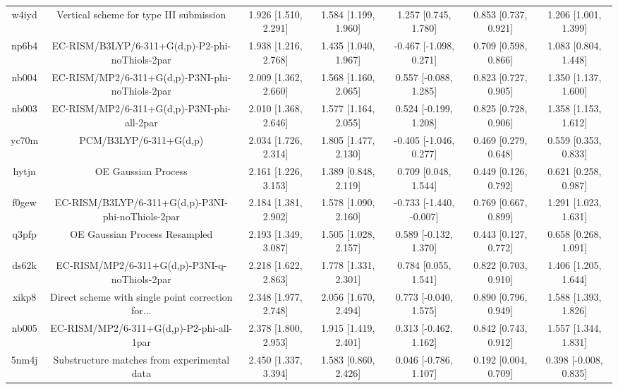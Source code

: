 \documentclass{article}
\begin{document}
\begin{center}
\begin{longtable}{|ccccccc|}
 w4iyd &            Vertical scheme for type III submission &  1.926 [1.510, 2.291] &  1.584 [1.199, 1.960] &     1.257 [0.745, 1.780] &  0.853 [0.737, 0.921] &   1.206 [1.001, 1.399] \\
 np6b4 &    EC-RISM/B3LYP/6-311+G(d,p)-P2-phi-noThiols-2par &  1.938 [1.216, 2.768] &  1.435 [1.040, 1.967] &   -0.467 [-1.098, 0.271] &  0.709 [0.598, 0.866] &   1.083 [0.804, 1.448] \\
 nb004 &    EC-RISM/MP2/6-311+G(d,p)-P3NI-phi-noThiols-2par &  2.009 [1.362, 2.660] &  1.568 [1.160, 2.065] &    0.557 [-0.088, 1.285] &  0.823 [0.727, 0.905] &   1.350 [1.137, 1.600] \\
 nb003 &         EC-RISM/MP2/6-311+G(d,p)-P3NI-phi-all-2par &  2.010 [1.368, 2.646] &  1.577 [1.164, 2.055] &    0.524 [-0.199, 1.208] &  0.825 [0.728, 0.906] &   1.358 [1.153, 1.612] \\
 yc70m &                             PCM/B3LYP/6-311+G(d,p) &  2.034 [1.726, 2.314] &  1.805 [1.477, 2.130] &   -0.405 [-1.046, 0.277] &  0.469 [0.279, 0.648] &   0.559 [0.353, 0.833] \\
 hytjn &                                OE Gaussian Process &  2.161 [1.226, 3.153] &  1.389 [0.848, 2.119] &     0.709 [0.048, 1.544] &  0.449 [0.126, 0.792] &   0.621 [0.258, 0.987] \\
 f0gew &  EC-RISM/B3LYP/6-311+G(d,p)-P3NI-phi-noThiols-2par &  2.184 [1.381, 2.902] &  1.578 [1.090, 2.160] &  -0.733 [-1.440, -0.007] &  0.769 [0.667, 0.899] &   1.291 [1.023, 1.631] \\
 q3pfp &                      OE Gaussian Process Resampled &  2.193 [1.349, 3.087] &  1.505 [1.028, 2.157] &    0.589 [-0.132, 1.370] &  0.443 [0.127, 0.772] &   0.658 [0.268, 1.091] \\
 ds62k &      EC-RISM/MP2/6-311+G(d,p)-P3NI-q-noThiols-2par &  2.218 [1.622, 2.863] &  1.778 [1.331, 2.301] &     0.784 [0.055, 1.541] &  0.822 [0.703, 0.910] &   1.406 [1.205, 1.644] \\
 xikp8 &  Direct scheme with single point correction for... &  2.348 [1.977, 2.748] &  2.056 [1.670, 2.494] &    0.773 [-0.040, 1.575] &  0.890 [0.796, 0.949] &   1.588 [1.393, 1.826] \\
 nb005 &           EC-RISM/MP2/6-311+G(d,p)-P2-phi-all-1par &  2.378 [1.800, 2.953] &  1.915 [1.419, 2.401] &    0.313 [-0.462, 1.162] &  0.842 [0.743, 0.912] &   1.557 [1.344, 1.831] \\
 5nm4j &        Substructure matches from experimental data &  2.450 [1.337, 3.394] &  1.583 [0.860, 2.426] &    0.046 [-0.786, 1.107] &  0.192 [0.004, 0.709] &  0.398 [-0.008, 0.835] \\

\end{longtable}
\end{center}
\end{document}
